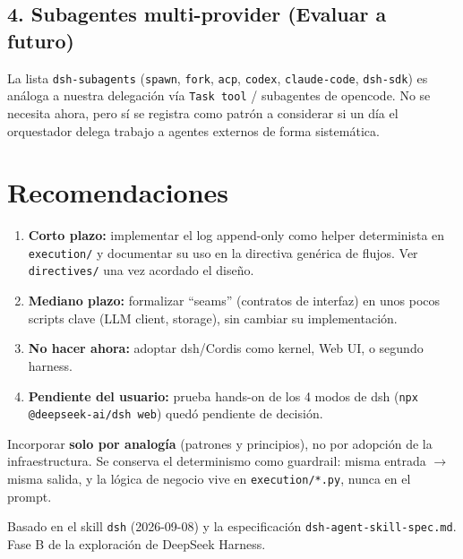 \documentclass[11pt,a4paper]{article}
\begin{document}
\subsection{4. Subagentes multi-provider (Evaluar a futuro)}

La lista \texttt{dsh-subagents} (\texttt{spawn}, \texttt{fork}, \texttt{acp}, \texttt{codex},
\texttt{claude-code}, \texttt{dsh-sdk}) es análoga a nuestra delegación vía \texttt{Task tool} /
subagentes de opencode. No se necesita ahora, pero sí se registra como patrón a considerar si
un día el orquestador delega trabajo a agentes externos de forma sistemática.

\section{Recomendaciones}

\begin{enumerate}[leftmargin=*,topsep=2pt,itemsep=1pt]
  \item \textbf{Corto plazo:} implementar el log append-only como helper determinista en
        \texttt{execution/} y documentar su uso en la directiva genérica de flujos. Ver
        \texttt{directives/} una vez acordado el diseño.
  \item \textbf{Mediano plazo:} formalizar ``seams'' (contratos de interfaz) en unos pocos
        scripts clave (LLM client, storage), sin cambiar su implementación.
  \item \textbf{No hacer ahora:} adoptar dsh/Cordis como kernel, Web UI, o segundo harness.
  \item \textbf{Pendiente del usuario:} prueba hands-on de los 4 modos de dsh
        (\texttt{npx @deepseek-ai/dsh web}) quedó pendiente de decisión.
\end{enumerate}

\begin{tcolorbox}[cajaRecomendacion, title={\faIcon{chess-knight}~Decisión adoptada}]
Incorporar \textbf{solo por analogía} (patrones y principios), no por adopción de la
infraestructura. Se conserva el determinismo como guardrail:
misma entrada $\rightarrow$ misma salida, y la lógica de negocio vive en \texttt{execution/*.py},
nunca en el prompt.
\end{tcolorbox}

\vspace{4pt}
\begin{center}
\color{grisTexto}\small Basado en el skill \texttt{dsh} (2026-09-08) y la especificación
\texttt{dsh-agent-skill-spec.md}. Fase B de la exploración de DeepSeek Harness.
\end{center}
\end{document}
